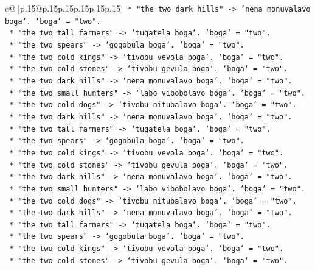 \documentclass{article}
\begin{document}
{\begin{supertabular}{c@{$\;$}|p{.15\linewidth}@{}p{.15\linewidth}p{.15\linewidth}p{.15\linewidth}p{.15\linewidth}p{.15\linewidth}}
{{{\texttt{        *   "the two dark hills" {-}> `nena monuvalavo boga`. `boga` = "two".} \\
\texttt{        *   "the two tall farmers" {-}> `tugatela boga`. `boga` = "two".} \\
\texttt{        *   "the two spears" {-}> `gogobula boga`. `boga` = "two".} \\
\texttt{        *   "the two cold kings" {-}> `tivobu vevola boga`. `boga` = "two".} \\
\texttt{        *   "the two cold stones" {-}> `tivobu gevula boga`. `boga` = "two".} \\
\texttt{        *   "the two dark hills" {-}> `nena monuvalavo boga`. `boga` = "two".} \\
\texttt{        *   "the two small hunters" {-}> `labo vibobolavo boga`. `boga` = "two".} \\
\texttt{        *   "the two cold dogs" {-}> `tivobu nitubalavo boga`. `boga` = "two".} \\
\texttt{        *   "the two dark hills" {-}> `nena monuvalavo boga`. `boga` = "two".} \\
\texttt{        *   "the two tall farmers" {-}> `tugatela boga`. `boga` = "two".} \\
\texttt{        *   "the two spears" {-}> `gogobula boga`. `boga` = "two".} \\
\texttt{        *   "the two cold kings" {-}> `tivobu vevola boga`. `boga` = "two".} \\
\texttt{        *   "the two cold stones" {-}> `tivobu gevula boga`. `boga` = "two".} \\
\texttt{        *   "the two dark hills" {-}> `nena monuvalavo boga`. `boga` = "two".} \\
\texttt{        *   "the two small hunters" {-}> `labo vibobolavo boga`. `boga` = "two".} \\
\texttt{        *   "the two cold dogs" {-}> `tivobu nitubalavo boga`. `boga` = "two".} \\
\texttt{        *   "the two dark hills" {-}> `nena monuvalavo boga`. `boga` = "two".} \\
\texttt{        *   "the two tall farmers" {-}> `tugatela boga`. `boga` = "two".} \\
\texttt{        *   "the two spears" {-}> `gogobula boga`. `boga` = "two".} \\
\texttt{        *   "the two cold kings" {-}> `tivobu vevola boga`. `boga` = "two".} \\
\texttt{        *   "the two cold stones" {-}> `tivobu gevula boga`. `boga` = "two".} \\
}}}
\end{supertabular}}
\end{document}
